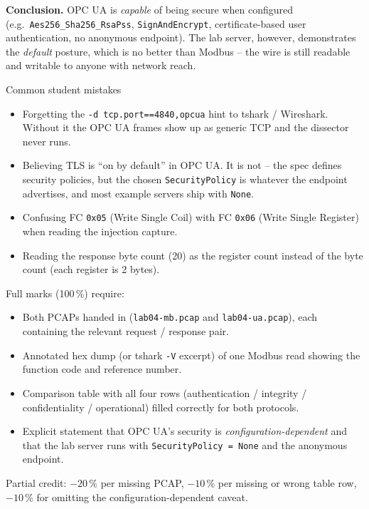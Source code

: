 \documentclass[11pt,a4paper]{article}
\begin{document}
\medskip
\noindent\textbf{Conclusion.} OPC UA is \emph{capable} of being secure
when configured (e.g.\ \texttt{Aes256\_Sha256\_RsaPss},
\texttt{SignAndEncrypt}, certificate-based user authentication, no
anonymous endpoint). The lab server, however, demonstrates the
\emph{default} posture, which is no better than Modbus -- the wire is
still readable and writable to anyone with network reach.

\begin{solutionbox}{Common student mistakes}
\begin{itemize}[leftmargin=*, nosep]
  \item Forgetting the \texttt{-d tcp.port==4840,opcua} hint to tshark
        / Wireshark. Without it the OPC UA frames show up as generic
        TCP and the dissector never runs.
  \item Believing TLS is ``on by default'' in OPC UA. It is not -- the
        spec defines security policies, but the chosen
        \texttt{SecurityPolicy} is whatever the endpoint advertises,
        and most example servers ship with \texttt{None}.
  \item Confusing FC \texttt{0x05} (Write Single Coil) with FC
        \texttt{0x06} (Write Single Register) when reading the
        injection capture.
  \item Reading the response byte count (20) as the register count
        instead of the byte count (each register is 2 bytes).
\end{itemize}
\end{solutionbox}

\begin{rubricbox}
Full marks (100\,\%) require:
\begin{itemize}[leftmargin=*, nosep]
  \item Both PCAPs handed in (\texttt{lab04-mb.pcap} and
        \texttt{lab04-ua.pcap}), each containing the relevant
        request / response pair.
  \item Annotated hex dump (or tshark \texttt{-V} excerpt) of one
        Modbus read showing the function code and reference number.
  \item Comparison table with all four rows
        (authentication / integrity / confidentiality / operational)
        filled correctly for both protocols.
  \item Explicit statement that OPC UA's security is
        \emph{configuration-dependent} and that the lab server runs
        with \texttt{SecurityPolicy = None} and the anonymous endpoint.
\end{itemize}
Partial credit: $-20\,\%$ per missing PCAP, $-10\,\%$ per missing or
wrong table row, $-10\,\%$ for omitting the configuration-dependent
caveat.
\end{rubricbox}
\end{document}
